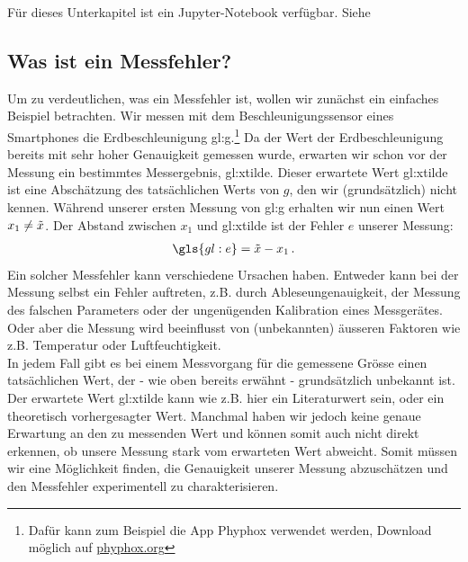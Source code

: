 \begin{center}
\begin{tcolorbox}[enhanced,width=6in,center upper,
    fontupper=\large,drop fuzzy shadow southwest,
    colframe=blue!50!black,colback=blue!10]
Für dieses Unterkapitel ist ein Jupyter-Notebook verfügbar. Siehe   
\end{tcolorbox}
\end{center}

\subsection{Was ist ein Messfehler?} %

Um zu verdeutlichen, was ein Messfehler ist, wollen wir zunächst ein einfaches Beispiel betrachten. Wir messen mit dem Beschleunigungssensor eines Smartphones die Erdbeschleunigung  \gls{gl:g}.\footnote{Dafür kann zum Beispiel die App Phyphox verwendet werden, Download möglich auf \href{https://phyphox.org}{phyphox.org}} Da der Wert der Erdbeschleunigung bereits mit sehr hoher Genauigkeit gemessen wurde,  erwarten wir schon vor der Messung ein bestimmtes Messergebnis, \gls{gl:xtilde}. Dieser erwartete Wert \gls{gl:xtilde} ist eine Abschätzung des tatsächlichen Werts von $g$, den wir (grundsätzlich) nicht kennen.  Während unserer ersten Messung von \gls{gl:g} erhalten wir nun einen Wert $x_1 \neq \Tilde{x}$. Der Abstand zwischen $x_1$ und \gls{gl:xtilde} ist der Fehler $e$ unserer Messung:
\begin{align}
\gls{gl:e} = \Tilde{x} - x_1\,.
\label{eq:messfehler}
\end{align}
Ein solcher Messfehler kann verschiedene Ursachen haben. Entweder kann bei der Messung selbst ein Fehler auftreten, z.B. durch  Ableseungenauigkeit, der Messung des falschen Parameters oder der ungenügenden Kalibration eines Messgerätes. Oder aber die Messung wird beeinflusst von (unbekannten) äusseren Faktoren wie z.B. Temperatur oder Luftfeuchtigkeit. \\

In jedem Fall gibt es bei einem Messvorgang für die gemessene Grösse einen tatsächlichen Wert, der - wie oben bereits erwähnt -  grundsätzlich unbekannt ist. Der erwartete Wert \gls{gl:xtilde} kann wie z.B. hier ein Literaturwert sein, oder ein theoretisch vorhergesagter Wert. Manchmal haben wir jedoch keine genaue Erwartung an den zu messenden Wert und können somit auch nicht direkt erkennen, ob unsere Messung stark vom erwarteten Wert abweicht. Somit müssen wir eine Möglichkeit finden, die Genauigkeit unserer Messung abzuschätzen und den Messfehler experimentell zu charakterisieren. 

